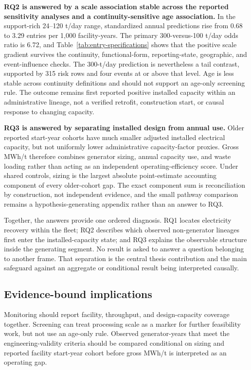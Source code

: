 \documentclass[12pt,letterpaper]{article}
\begin{document}
\textbf{RQ2 is answered by a scale association stable across the reported
sensitivity analyses and a continuity-sensitive age association.} In the
support-rich 24--120 t/day range, standardized annual predictions rise from
0.68 to 3.29 entries per 1,000 facility-years. The primary
300-versus-100 t/day odds ratio is 6.72, and
Table~\ref{tab:entry-specifications} shows that the positive scale gradient
survives the continuity, functional-form, reporting-state, geographic, and
event-influence checks. The 300-t/day prediction is nevertheless a tail
contrast, supported by 315 risk rows and four events at or above that level.
Age is less stable across continuity definitions and should not support an
age-only screening rule. The outcome remains first reported positive installed
capacity within an administrative lineage, not a verified retrofit,
construction start, or causal response to changing capacity.

\textbf{RQ3 is answered by separating installed design from annual use.} Older
reported start-year cohorts have much smaller adjusted installed electrical
capacity, but not uniformly lower administrative capacity-factor proxies. Gross
MWh/t therefore combines generator sizing, annual capacity use, and waste
loading rather than acting as an independent operating-efficiency score. Under
shared controls, sizing is the largest absolute point-estimate accounting
component of every older-cohort gap. The exact component sum is reconciliation
by construction, not independent evidence, and the small pathway comparison
remains a hypothesis-generating appendix rather than an answer to RQ3.

Together, the answers provide one ordered diagnosis. RQ1 locates electricity
recovery within the fleet; RQ2 describes which observed non-generator lineages
first enter the installed-capacity state; and RQ3 explains the observable
structure inside the generating segment. No result is asked to answer a
question belonging to another frame. That separation is the central thesis
contribution and the main safeguard against an aggregate or conditional result
being interpreted causally.

\subsection{Evidence-bound implications}

Monitoring should report facility, throughput, and design-capacity coverage
together. Screening can treat processing scale as a marker for further
feasibility work, but not use an age-only rule. Observed generator-years that
meet the engineering-validity criteria should be compared conditional on sizing
and reported facility start-year cohort before gross MWh/t is interpreted as an
operating gap.
\end{document}
